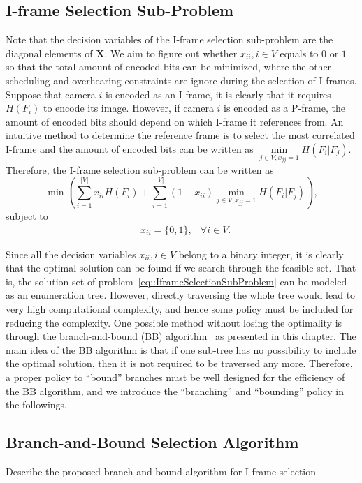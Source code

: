 \subsection{I-frame Selection Sub-Problem}
\label{sec::iFrameSelectionSubProb}
Note that the decision variables of the I-frame selection sub-problem are the diagonal elements of $\mathbf{X}$.
We aim to figure out whether ${x_{ii},i \in V}$ equals to $0$ or $1$ so that the total amount of encoded bits can be minimized, where the other scheduling and overhearing constraints are ignore during the selection of I-frames.
Suppose that camera $i$ is encoded as an I-frame, it is clearly that it requires $H(F_i)$ to encode its image.
However, if camera $i$ is encoded as a P-frame, the amount of encoded bits should depend on which I-frame it references from.
An intuitive method to determine the reference frame is to select the most correlated I-frame and the amount of encoded bits can be written as $\underset{j \in V, x_{jj}=1}{\min} H(F_i|F_j)$.
Therefore, the I-frame selection sub-problem can be written as
\begin{equation*}
\min \left(
\sum_{i=1}^{|V|} x_{ii}H(F_i) +
\sum_{i=1}^{|V|} (1-x_{ii}) \underset{j \in V, x_{jj}=1}{\min} H(F_i|F_j) \right),
\end{equation*}
subject to
\begin{align}
&x_{ii} = \{0,1\}, &\forall i \in V.
\label{eq::IframeSelectionSubProblem}
\end{align}

Since all the decision variables ${x_{ii},i \in V}$ belong to a binary integer, it is clearly that the optimal solution can be found if we search through the feasible set.
That is, the solution set of problem~\eqref{eq::IframeSelectionSubProblem} can be modeled as an enumeration tree.
However, directly traversing the whole tree would lead to very high computational complexity, and hence some policy must be included for reducing the complexity.
One possible method without losing the optimality is through the branch-and-bound (BB) algorithm~\cite{BB} as presented in this chapter.
The main idea of the BB algorithm is that if one sub-tree has no possibility to include the optimal solution, then it is not required to be traversed any more.
Therefore, a proper policy to ``bound'' branches must be well designed for the efficiency of the BB algorithm, and we introduce the ``branching'' and ``bounding'' policy in the followings.
%
\subsection{Branch-and-Bound Selection Algorithm}
{\color{red}Describe the proposed branch-and-bound algorithm for I-frame selection}
